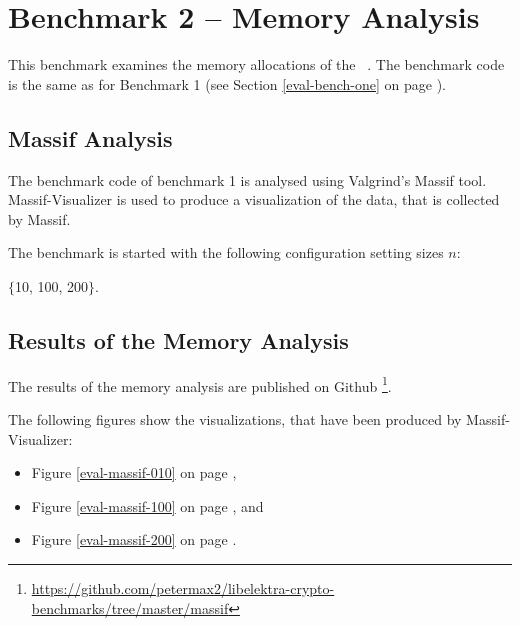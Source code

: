 \section{Benchmark 2 -- Memory Analysis}
\label{eval-bench-two}

This benchmark examines the memory allocations of the \crypto ~.
The benchmark code is the same as for Benchmark 1 (see Section \ref{eval-bench-one} on page \pageref{eval-bench-one}).

	\subsection{Massif Analysis}

The benchmark code of benchmark 1 is analysed using Valgrind's Massif tool.
Massif-Visualizer is used to produce a visualization of the data, that is collected by Massif.

The benchmark is started with the following configuration setting sizes $n$:

$\{$10, 100, 200$\}$.

	\subsection{Results of the Memory Analysis}

The results of the memory analysis  are published on Github
\footnote{\url{https://github.com/petermax2/libelektra-crypto-benchmarks/tree/master/massif}}.

The following figures show the visualizations, that have been produced by Massif-Visualizer:

\begin{itemize}
\item Figure \ref{eval-massif-010} on page \pageref{eval-massif-010},
\item Figure \ref{eval-massif-100} on page \pageref{eval-massif-100}, and
\item Figure \ref{eval-massif-200} on page \pageref{eval-massif-200}.
\end{itemize}


